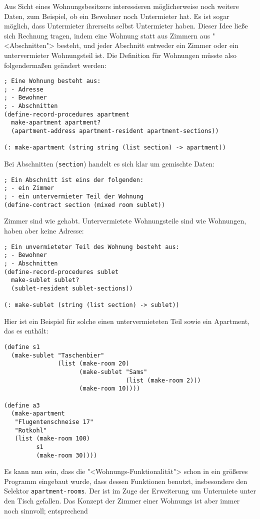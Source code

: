 Aus Sicht eines Wohnungsbesitzers interessieren möglicherweise noch
weitere Daten, zum Beispiel, ob ein Bewohner noch Untermieter hat.
Es ist sogar möglich, dass Untermieter ihrerseits selbst Untermieter
haben.  Dieser Idee ließe sich Rechnung tragen, indem eine Wohnung
statt aus Zimmern aus "<Abschnitten"> besteht, und jeder Abschnitt
entweder ein Zimmer oder ein untervermieter Wohnungsteil ist.  Die
Definition für Wohnungen müsste also folgendermaßen geändert werden:
%
\begin{verbatim}
; Eine Wohnung besteht aus:
; - Adresse
; - Bewohner
; - Abschnitten
(define-record-procedures apartment
  make-apartment apartment?
  (apartment-address apartment-resident apartment-sections))

(: make-apartment (string string (list section) -> apartment))
\end{verbatim}
%
Bei Abschnitten (\texttt{section}) handelt es sich klar um gemischte
Daten:
%
\begin{verbatim}
; Ein Abschnitt ist eins der folgenden:
; - ein Zimmer
; - ein untervermieter Teil der Wohnung
(define-contract section (mixed room sublet))
\end{verbatim}
%
Zimmer sind wie gehabt.   Untervermietete Wohnungsteile sind wie
Wohnungen, haben aber keine Adresse:
%
\begin{verbatim}
; Ein unvermieteter Teil des Wohnung besteht aus:
; - Bewohner
; - Abschnitten
(define-record-procedures sublet
  make-sublet sublet?
  (sublet-resident sublet-sections))

(: make-sublet (string (list section) -> sublet))
\end{verbatim}
%
Hier ist ein Beispiel für solche einen untervermieteten Teil sowie ein
Apartment, das es enthält:
%
\begin{verbatim}
(define s1
  (make-sublet "Taschenbier"
               (list (make-room 20) 
                     (make-sublet "Sams"
                                  (list (make-room 2)))
                     (make-room 10))))

(define a3
  (make-apartment
   "Flugentenschneise 17"
   "Rotkohl"
   (list (make-room 100)
         s1
         (make-room 30))))
\end{verbatim}
%
Es kann nun sein, dass die "<Wohnungs-Funktionalität"> schon in ein
größeres Programm eingebaut wurde, dass dessen Funktionen benutzt,
insbesondere den Selektor \texttt{apartment-rooms}.  Der ist im Zuge
der Erweiterung um Untermiete unter den Tisch gefallen.  Das Konzept
der Zimmer einer Wohnungs ist aber immer noch sinnvoll; entsprechend
